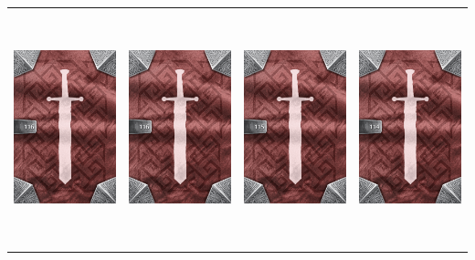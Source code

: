 \documentclass{minimal}
\begin{document}
{\begin{longtable}{llll}
\includegraphics[width=44mm,height=68mm]{./64-151/gh-116-fueled-falchion-back.png} &
\includegraphics[width=44mm,height=68mm]{./64-151/gh-116-fueled-falchion-back.png} &
\includegraphics[width=44mm,height=68mm]{./64-151/gh-115-mountain-hammer-back.png} &
\includegraphics[width=44mm,height=68mm]{./64-151/gh-114-staff-of-xorn-back.png}\\ 

\end{longtable}}
\end{document}
